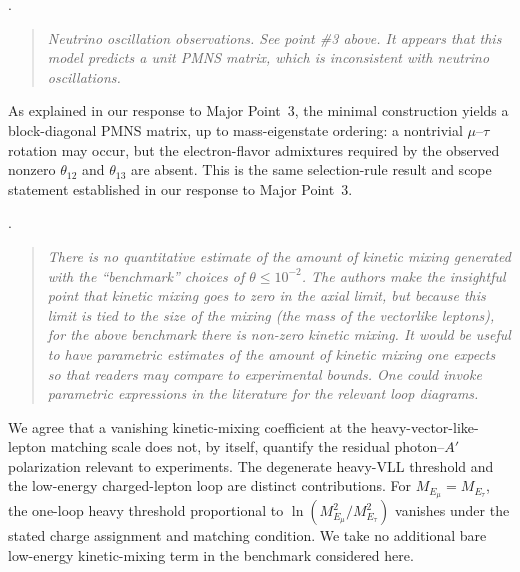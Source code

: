 \documentclass[12pt,a4paper]{article}
\begin{document}
\medskip
{}.
\begin{quote}\itshape
Neutrino oscillation observations. See point \#3 above. It appears that this model predicts a unit PMNS matrix, which is inconsistent with neutrino oscillations.
\end{quote}


As explained in our response to Major Point~3, the minimal construction yields a block-diagonal PMNS matrix, up to mass-eigenstate ordering: a nontrivial \(\mu\)--\(\tau\) rotation may occur, but the electron-flavor admixtures required by the observed nonzero \(\theta_{12}\) and \(\theta_{13}\) are absent. This is the same selection-rule result and scope statement established in our response to Major Point~3.

\medskip
{}.
\begin{quote}\itshape
There is no quantitative estimate of the amount of kinetic mixing generated with the ``benchmark'' choices of \(\theta\leq10^{-2}\). The authors make the insightful point that kinetic mixing goes to zero in the axial limit, but because this limit is tied to the size of the mixing (the mass of the vectorlike leptons), for the above benchmark there is non-zero kinetic mixing. It would be useful to have parametric estimates of the amount of kinetic mixing one expects so that readers may compare to experimental bounds. One could invoke parametric expressions in the literature for the relevant loop diagrams.
\end{quote}


We agree that a vanishing kinetic-mixing coefficient at the heavy-vector-like-lepton matching scale does not, by itself, quantify the residual photon--\(A'\) polarization relevant to experiments. The degenerate heavy-VLL threshold and the low-energy charged-lepton loop are distinct contributions. For \(M_{E_\mu}=M_{E_\tau}\), the one-loop heavy threshold proportional to \(\ln(M_{E_\mu}^2/M_{E_\tau}^2)\) vanishes under the stated charge assignment and matching condition. We take no additional bare low-energy kinetic-mixing term in the benchmark considered here.
\end{document}
